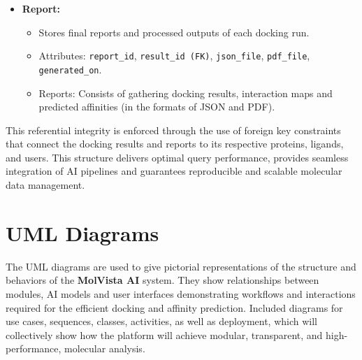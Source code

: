 \documentclass[12pt,a4]{report}
\begin{document}
\begin{itemize}
\item \textbf{Report:}
\begin{itemize}
\item Stores final reports and processed outputs of each docking run.
\item Attributes: \texttt{report\_id}, \texttt{result\_id (FK)}, \texttt{json\_file}, \texttt{pdf\_file}, \texttt{generated\_on}.
\item Reports: Consists of gathering docking results, interaction maps and predicted affinities (in the formats of JSON and PDF).
\end{itemize}
\end{itemize}

\vspace{0.4cm}
\hspace{0.3in} This referential integrity is enforced through the use of foreign key constraints that connect the docking results and reports to its respective proteins, ligands, and users. This structure delivers optimal query performance, provides seamless integration of AI pipelines and guarantees reproducible and scalable molecular data management.

\vspace{0.2cm}
\section{UML Diagrams}
\vspace{0.1cm}
\hspace{0.3in}The UML diagrams are used to give pictorial representations of the structure and behaviors of the \textbf{MolVista AI} system. They show relationships between modules, AI models and user interfaces demonstrating workflows and interactions required for the efficient docking and affinity prediction. Included diagrams for use cases, sequences, classes, activities, as well as deployment, which will collectively show how the platform will achieve modular, transparent, and high-performance, molecular analysis.
\end{document}
